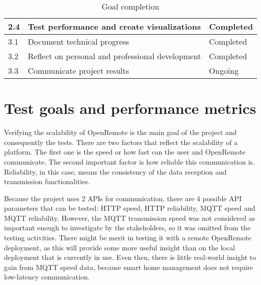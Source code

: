 \begin{table}[ht]
\begin{adjustbox}{angle=0}
\begin{tabular}{|l|l|l|}
	2.4    & Test performance and create visualizations                                                                                                                                               & \cellcolor[HTML]{34FF34}Completed   \\ \hline
	3.1    & Document technical progress                                                                                                                                                              & \cellcolor[HTML]{34FF34}Completed   \\ \hline
	3.2    & Reflect on personal and professional development                                                                                                                                         & \cellcolor[HTML]{34FF34}Completed   \\ \hline
	3.3    & Communicate project results                                                                                                                                                              & \cellcolor[HTML]{F8FF00}Ongoing     \\ \hline
\end{tabular}
\end{adjustbox}
\caption{Goal completion}
\label{tab:goal_com}
\end{table}



\section{Test goals and performance metrics}
Verifying the scalability of OpenRemote is the main goal of the project and consequently the tests. There are two factors that reflect the scalability of a platform. The first one is the speed or how fast can the user and OpenRemote communicate. The second important factor is how reliable this communication is. Reliability, in this case, means the consistency of the data reception and transmission functionalities.

Because the project uses 2 APIs for communication, there are 4 possible API parameters that can be tested: HTTP speed, HTTP reliability, MQTT speed and MQTT reliability. However, the MQTT transmission speed was not considered as important enough to investigate by the stakeholders, so it was omitted from the testing activities. There might be merit in testing it with a remote OpenRemote deployment, as this will provide some more useful insight than on the local deployment that is currently in use. Even then, there is little real-world insight to gain from MQTT speed data, because smart home management does not require low-latency communication.

